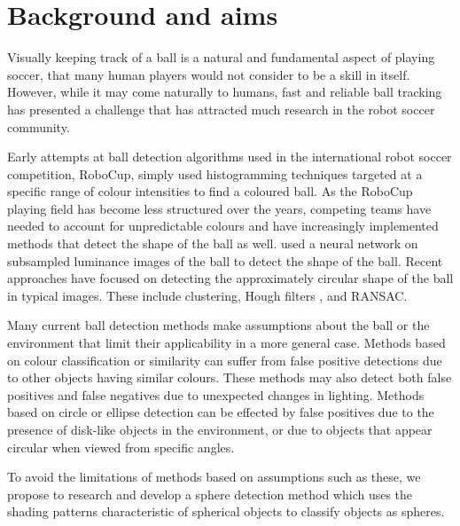\documentclass[11pt]{scrartcl}
\begin{document}
    \section{Background and aims} {

        Visually keeping track of a ball is a natural and fundamental aspect of playing
        soccer, that many human players would not consider to be a skill in itself.
        However, while it may come naturally to humans, fast and reliable ball
        tracking has presented a challenge that has attracted much research in
        the robot soccer community.

        Early attempts at ball detection algorithms used in the international robot soccer competition,
        RoboCup, simply used histogramming techniques targeted at a specific range of colour intensities to find a coloured ball. As the RoboCup playing field has become less structured over the years, competing teams have needed to account for unpredictable colours and have increasingly implemented methods that detect the shape of the ball as well.
        \citet{schulz2007ball} used a neural network on
        subsampled luminance images of the ball to detect the shape of the
        ball. Recent approaches have focused on detecting the approximately
        circular shape of the ball in typical images. These include
        clustering, Hough filters \citet{li2013survey}, and RANSAC. 


        Many current ball detection methods make assumptions about the ball or
        the environment that limit their applicability in a more general case. Methods
        based on colour classification or similarity can suffer from false
        positive detections due to other objects having similar colours. These methods may
        also detect both false positives and false negatives due to unexpected changes
        in lighting. Methods based on circle or ellipse detection can be effected by
        false positives due to the presence of disk-like objects in the
        environment, or due to objects that appear circular when viewed from
        specific angles.

        To avoid the limitations of methods based on assumptions such as
        these, we propose to research and develop a sphere detection method which uses
        the shading patterns characteristic of spherical objects to classify
        objects as spheres.

}
\end{document}
